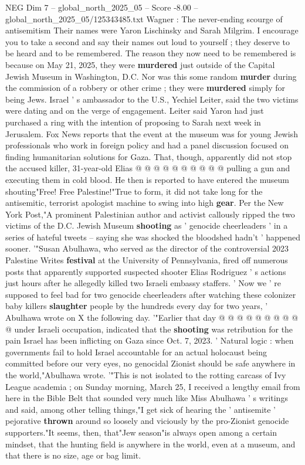 \begin{textsample}{NEG Dim 7 – global\_north\_2025\_05 – Score -8.00 – global\_north\_2025\_05/125343485.txt}  \label{ex:f7_neg_105}
Wagner : The never-ending scourge of antisemitism Their names were Yaron Lischinsky and Sarah Milgrim.
I encourage you to take a second and say their names out loud to yourself ; they deserve to be heard and to be remembered.
The reason they now need to be remembered is because on May 21, 2025, they were \textbf{murdered} just outside of the Capital Jewish Museum in Washington, D.C.
Nor was this some random \textbf{murder} during the commission of a robbery or other crime ; they were \textbf{murdered} simply for being Jews.
Israel ' s ambassador to the U.S., Yechiel Leiter, said the two victims were dating and on the verge of engagement.
Leiter said Yaron had just purchased a ring with the intention of proposing to Sarah next week in Jerusalem.
Fox News reports that the event at the museum was for young Jewish professionals who work in foreign policy and had a panel discussion focused on finding humanitarian solutions for Gaza.
That, though, apparently did not stop the accused killer, 31-year-old Elias @ @ @ @ @ @ @ @ @ @ pulling a gun and executing them in cold blood.
He then is reported to have entered the museum shouting"Free!
Free Palestine!"True to form, it did not take long for the antisemitic, terrorist apologist machine to swing into high \textbf{gear}.
Per the New York Post,"A prominent Palestinian author and activist callously ripped the two victims of the D.C.
Jewish Museum \textbf{shooting} as ' genocide cheerleaders ' in a series of hateful tweets -- saying she was shocked the bloodshed hadn't ' happened sooner. '"Susan Abulhawa, who served as the director of the controversial 2023 Palestine Writes \textbf{festival} at the University of Pennsylvania, fired off numerous posts that apparently supported suspected shooter Elias Rodriguez ' s actions just hours after he allegedly killed two Israeli embassy staffers. ' Now we ' re supposed to feel bad for two genocide cheerleaders after watching these colonizer baby killers \textbf{slaughter} people by the hundreds every day for two years, ' Abulhawa wrote on X the following day. '"Earlier that day @ @ @ @ @ @ @ @ @ @ under Israeli occupation, indicated that the \textbf{shooting} was retribution for the pain Israel has been inflicting on Gaza since Oct. 7, 2023. ' Natural logic : when governments fail to hold Israel accountable for an actual holocaust being committed before our very eyes, no genocidal Zionist should be safe anywhere in the world,"Abulhawa wrote. '"This is not isolated to the rotting carcass of Ivy League academia ; on Sunday morning, March 25, I received a lengthy email from here in the Bible Belt that sounded very much like Miss Abulhawa ' s writings and said, among other telling things,"I get sick of hearing the ' antisemite ' pejorative \textbf{thrown} around so loosely and viciously by the pro-Zionist genocide supporters."It seems, then, that"Jew season"is always open among a certain mindset, that the hunting field is anywhere in the world, even at a museum, and that there is no size, age or bag limit.

\end{textsample}

